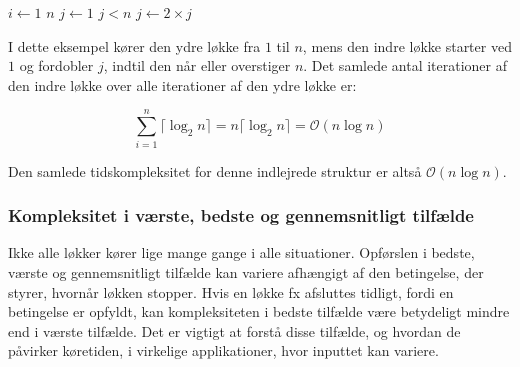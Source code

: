 \begin{example}

    \begin{codebox}
        \li \For $i \gets 1$ \To $n$ \Do
        \li     $j \gets 1$
        \li     \While $j < n$ \Do
        \li         {}
        \li         $j \gets 2 \times j$
                \End
            \End
    \end{codebox}

    I dette eksempel kører den ydre løkke fra $1$ til $n$, mens den indre løkke starter ved $1$ og fordobler $j$, indtil den når eller overstiger $n$. Det samlede antal iterationer af den indre løkke over alle iterationer af den ydre løkke er:

    \[
    \sum_{i=1}^{n} \lceil\log_2 n\rceil = n\lceil\log_2 n\rceil = \mathcal{O}(n \log n)
    \]

    Den samlede tidskompleksitet for denne indlejrede struktur er altså $\mathcal{O}(n \log n)$.
\end{example}



\subsubsection*{Kompleksitet i værste, bedste og gennemsnitligt tilfælde}
Ikke alle løkker kører lige mange gange i alle situationer. Opførslen i bedste, værste og gennemsnitligt tilfælde kan variere afhængigt af den betingelse, der styrer, hvornår løkken stopper. Hvis en løkke fx afsluttes tidligt, fordi en betingelse er opfyldt, kan kompleksiteten i bedste tilfælde være betydeligt mindre end i værste tilfælde. Det er vigtigt at forstå disse tilfælde, og hvordan de påvirker køretiden, i virkelige applikationer, hvor inputtet kan variere.

